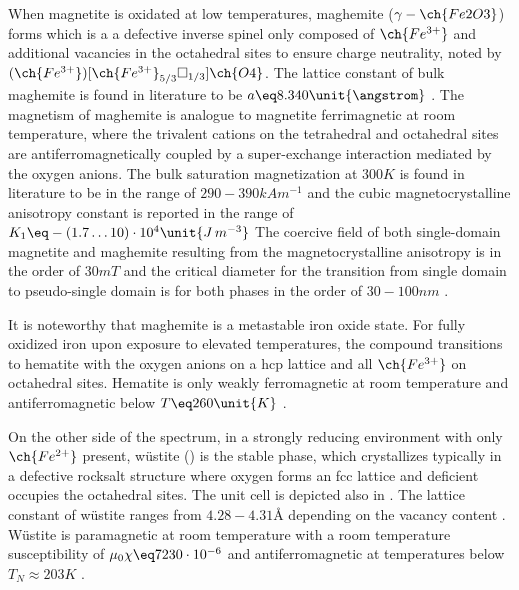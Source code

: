 \documentclass[\main/dresen_thesis.tex]{subfiles}
\begin{document}
  When magnetite is oxidated at low temperatures, maghemite ($\gamma-\ch{Fe2O3}$) forms which is a a defective inverse spinel only composed of $\ch{Fe^{3+}}$ and additional vacancies in the octahedral sites to ensure charge neutrality, noted by $(\ch{Fe^{3+}})[\ch{Fe^{3+}}_{5/3}\square_{1/3}]\ch{O4}$.
  The lattice constant of bulk maghemite is found in literature to be $a \eq 8.340 \unit{\angstrom}$ \cite{Cornell_2003_Their}.
  The magnetism of maghemite is analogue to magnetite ferrimagnetic at room temperature, where the trivalent cations on the tetrahedral and octahedral sites are antiferromagnetically coupled by a super-exchange interaction mediated by the oxygen anions.
  The bulk saturation magnetization at $300 \unit{K}$ is found in literature to be in the range of $290 - 390 \unit{kA m^{-1}}$ and the cubic magnetocrystalline anisotropy constant is reported in the range of $K_1 \eq -(1.7 \ldots 10) \cdot 10^{4} \unit{J \, m^{-3}}$ \cite{Cornell_2003_Their}
  The coercive field of both single-domain magnetite and maghemite resulting from the magnetocrystalline anisotropy is in the order of $30 \unit{mT}$ and the critical diameter for the transition from single domain to pseudo-single domain is for both phases in the order of $30 - 100 \unit{nm}$ \cite{Cornell_2003_Their}.

  It is noteworthy that maghemite is a metastable iron oxide state.
  For fully oxidized iron upon exposure to elevated temperatures, the compound transitions to hematite with the oxygen anions on a hcp lattice and all $\ch{Fe^{3+}}$ on octahedral sites.
  Hematite is only weakly ferromagnetic at room temperature and antiferromagnetic below $T \eq 260 \unit{K}$ \cite{Cornell_2003_Their}.

  On the other side of the spectrum, in a strongly reducing environment with only $\ch{Fe^{2+}}$ present, w\"ustite () is the stable phase, which crystallizes typically in a defective rocksalt structure where oxygen forms an fcc lattice and deficient  occupies the octahedral sites.
  The unit cell is depicted also in .
  The lattice constant of w\"ustite ranges from $4.28 - 4.31 \unit{\angstrom}$ depending on the vacancy content \cite{Cornell_2003_Their}.
  W\"ustite is paramagnetic at room temperature with a room temperature susceptibility of $\mu_0 \chi \eq 7230 \cdot 10^{-6}$ \cite{Lide_2004_Handb} and antiferromagnetic at temperatures below $T_N \approx 203 K$ \cite{Cornell_2003_Their}.
\end{document}
